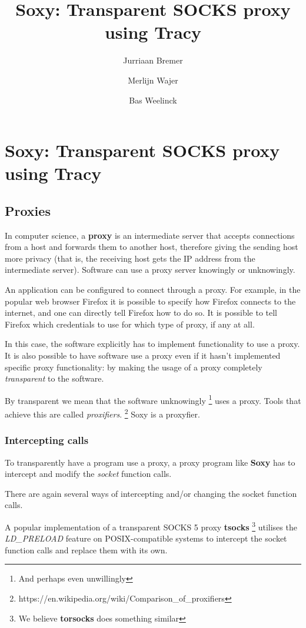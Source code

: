 \documentclass[a4paper]{article}
\author{Jurriaan Bremer \and Merlijn Wajer \and Bas Weelinck}
\title{Soxy: Transparent SOCKS proxy using Tracy}
\begin{document}
\maketitle

\section{Soxy: Transparent SOCKS proxy using Tracy}

\subsection{Proxies}
In computer science, a \textbf{proxy} is an intermediate server that
accepts connections from a host and forwards them to another host,
therefore giving the sending host more privacy (that is, the
receiving host gets the IP address from the intermediate server).
Software can use a proxy server knowingly or unknowingly.

An application can be configured to connect through a proxy. For example, in
the popular web browser Firefox it is possible to specify how Firefox connects
to the internet, and one can directly tell Firefox how to do so.
It is possible to tell Firefox which credentials to use for which type of proxy,
if any at all.

In this case, the software explicitly has to implement functionality to use a
proxy. It is also possible to have software use a proxy even if it hasn't
implemented specific proxy functionality: by making the usage of a proxy
completely \textit{transparent} to the software.

By transparent we mean that the software unknowingly
\footnote{And perhaps even unwillingly} uses a proxy. Tools that achieve this
are called \textit{proxifiers}.
\footnote{https://en.wikipedia.org/wiki/Comparison\_of\_proxifiers}
Soxy is a proxyfier.

\subsubsection{Intercepting calls}

To transparently have a program use a proxy, a proxy program like \textbf{Soxy}
has to intercept and modify the \textit{socket} function calls.

There are again several ways of intercepting and/or changing the socket function
calls.

A popular implementation of a transparent SOCKS 5 proxy \textbf{tsocks}
\footnote{We believe \textbf{torsocks} does something similar}
utilises the \textit{LD\_PRELOAD} feature on POSIX-compatible systems to
intercept the socket function calls and replace them with its own.
\end{document}

